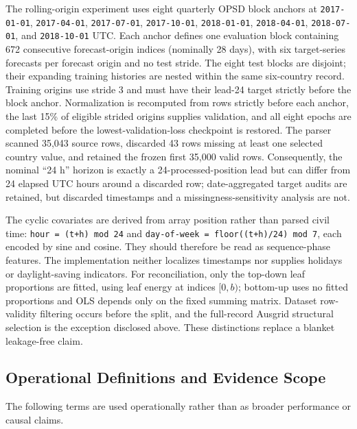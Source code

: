 \documentclass[electronics,article,submit,moreauthors]{Definitions/mdpi}
\begin{document}
The rolling-origin experiment uses eight quarterly OPSD block anchors at \texttt{2017-01-01}, \texttt{2017-04-01}, \texttt{2017-07-01}, \texttt{2017-10-01}, \texttt{2018-01-01}, \texttt{2018-04-01}, \texttt{2018-07-01}, and \texttt{2018-10-01} UTC. Each anchor defines one evaluation block containing 672 consecutive forecast-origin indices (nominally 28 days), with six target-series forecasts per forecast origin and no test stride. The eight test blocks are disjoint; their expanding training histories are nested within the same six-country record. Training origins use stride 3 and must have their lead-24 target strictly before the block anchor. Normalization is recomputed from rows strictly before each anchor, the last 15\% of eligible strided origins supplies validation, and all eight epochs are completed before the lowest-validation-loss checkpoint is restored. The parser scanned 35,043 source rows, discarded 43 rows missing at least one selected country value, and retained the frozen first 35,000 valid rows. Consequently, the nominal ``24 h'' horizon is exactly a 24-processed-position lead but can differ from 24 elapsed UTC hours around a discarded row; date-aggregated target audits are retained, but discarded timestamps and a missingness-sensitivity analysis are not.

The cyclic covariates are derived from array position rather than parsed civil time: \texttt{hour\ =\ (t+h)\ mod\ 24} and \texttt{day-of-week\ =\ floor((t+h)/24)\ mod\ 7}, each encoded by sine and cosine. They should therefore be read as sequence-phase features. The implementation neither localizes timestamps nor supplies holidays or daylight-saving indicators. For reconciliation, only the top-down leaf proportions are fitted, using leaf energy at indices \([0,b)\); bottom-up uses no fitted proportions and OLS depends only on the fixed summing matrix. Dataset row-validity filtering occurs before the split, and the full-record Ausgrid structural selection is the exception disclosed above. These distinctions replace a blanket leakage-free claim.

\subsection{Operational Definitions and Evidence Scope}\label{operational-definitions-and-evidence-scope}

The following terms are used operationally rather than as broader performance or causal claims.
\end{document}

